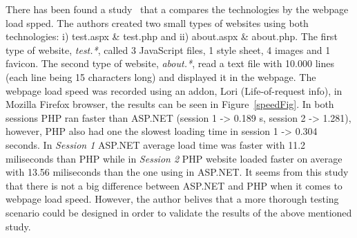 \documentclass[11]{article}
\begin{document}
	\indent
	There has been found  a study~\citep{mirzoev2014webpage} that a compares the technologies by the webpage load spped. The authors created two small types of websites using both technologies: i) test.aspx \& test.php and ii) about.aspx \& about.php. The first type of website, \textit{test.*}, called 3 JavaScript files, 1 style sheet, 4 images and 1 favicon. The second type of website, \textit{about.*}, read a text file with 10.000 lines (each line being 15 characters long) and displayed it in the webpage. The webpage load speed was recorded using an addon, Lori (Life-of-request info), in Mozilla Firefox browser, the results can be seen in Figure~\ref{speedFig}. In both sessions PHP ran faster than ASP.NET (session 1 -> 0.189 s, session 2 -> 1.281), however, PHP also had one the slowest loading time in session 1 -> 0.304 seconds. In \textit{Session 1} ASP.NET average load time was faster with 11.2 miliseconds than PHP while in \textit{Session 2} PHP website loaded faster on average with 13.56 miliseconds than the one using in ASP.NET. It seems from this study that there is not a big difference between ASP.NET and PHP when it comes to webpage load speed. However, the author belives that a more thorough testing scenario could be designed in order to validate the results of the above mentioned study. 
\end{document}
